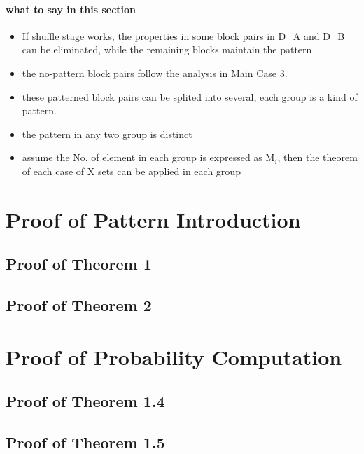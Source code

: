 \documentclass{article}
\begin{document}
\paragraph{what to say in this section}
\begin{itemize}
	\item If shuffle stage works, the properties in some block pairs in D\_A and D\_B can be eliminated, while the remaining blocks maintain the pattern
	\item the no-pattern block pairs follow the analysis in Main Case 3.
	\item these patterned block pairs can be splited into several, each group is a kind of pattern.
	\item the pattern in any two group is distinct
	\item assume the No. of element in each group is expressed as M$_i$, then the theorem of each case of X sets can be applied in each group
\end{itemize}

\appendix
\section{Proof of Pattern Introduction}
\subsection{Proof of Theorem 1}
\subsection{Proof of Theorem 2}
\section{Proof of Probability Computation}
\subsection{Proof of Theorem 1.4}
\subsection{Proof of Theorem 1.5}
\end{document}
